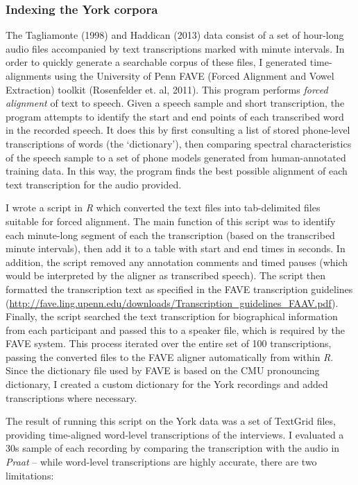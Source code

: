 \documentclass{article}
\begin{document}
\subsubsection*{Indexing the York corpora}

The Tagliamonte (1998) and Haddican (2013) data consist of a set of hour-long audio files accompanied by text transcriptions marked with minute intervals. In order to quickly generate a searchable corpus of these files, I generated time-alignments using the University of Penn FAVE (Forced Alignment and Vowel Extraction) toolkit (Rosenfelder et. al, 2011). This program performs \textit{forced alignment} of text to speech. Given a speech sample and short transcription, the program attempts to identify the start and end points of each transcribed word in the recorded speech. It does this by first consulting a list of stored phone-level transcriptions of words (the `dictionary'), then comparing spectral characteristics of the speech sample to a set of phone models generated from human-annotated training data. In this way, the program finds the best possible alignment of each text transcription for the audio provided.


I wrote a script in \textit{R} which converted the text files into tab-delimited files suitable for forced alignment. The main function of this script was to identify each minute-long segment of each the transcription (based on the transcribed minute intervals), then add it to a table with start and end times in seconds. In addition, the script removed any annotation comments and timed pauses (which would be interpreted by the aligner as transcribed speech). The script then formatted the transcription text as specified in the FAVE transcription guidelines (\url{http://fave.ling.upenn.edu/downloads/Transcription_guidelines_FAAV.pdf}). Finally, the script searched the text transcription for biographical information from each participant and passed this to a speaker file, which is required by the FAVE system. This process iterated over the entire set of 100 transcriptions, passing the converted files to the FAVE aligner automatically from within \textit{R}. Since the dictionary file used by FAVE is based on the CMU pronouncing dictionary, I created a custom dictionary for the York recordings and added transcriptions where necessary.

The result of running this script on the York data was a set of TextGrid files, providing time-aligned word-level transcriptions of the interviews. I evaluated a 30s sample of each recording by comparing the transcription with the audio in \textit{Praat} -- while word-level transcriptions are highly accurate, there are two limitations:
\end{document}
